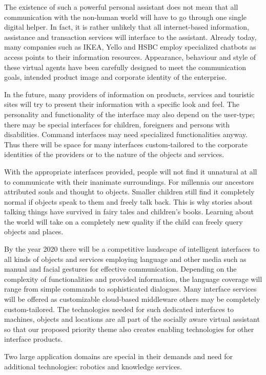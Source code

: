 \documentclass[10pt, plain]{../../metanetpaper}
\begin{document}
\begin{multicols}{2}
The existence of such a powerful personal assistant does not mean that all communication with the non-human world will have to go through one single digital helper. In fact, it is rather unlikely that all internet-based information, assistance and transaction services will interface to the assistant. Already today, many companies such as IKEA, Yello and HSBC employ specialized chatbots as access points to their information resources. Appearance, behaviour and style of these virtual agents have been carefully designed to meet the communication goals, intended product image and corporate identity of the enterprise.
 
In the future, many providers of information on products, services and touristic sites will try to present their information with a specific look and feel. The personality and functionality of the interface may also depend on the user-type; there may be special interfaces for children, foreigners and persons with disabilities. Command interfaces may need specialized functionalities anyway. Thus there will be space for many interfaces custom-tailored to the corporate identities of the providers or to the nature of the objects and services.
 
With the appropriate interfaces provided, people will not find it unnatural at all to communicate with their inanimate surroundings. For millennia our ancestors attributed souls and thought to objects. Smaller children still find it completely normal if objects speak to them and freely talk back. This is why stories about talking things have survived in fairy tales and children’s books. Learning about the world will take on a completely new quality if the child can freely query objects and places.
 
By the year 2020 there will be a competitive landscape of intelligent interfaces to all kinds of objects and services employing language and other media such as manual and facial gestures for effective communication. Depending on the complexity of functionalities and provided information, the language coverage will range from simple commands to sophisticated dialogues. Many interface services will be offered as customizable cloud-based middleware others may be completely custom-tailored. The technologies needed for such dedicated interfaces to machines, objects and locations are all part of the socially aware virtual assistant so that our proposed priority theme also creates enabling technologies for other interface products.
 
Two large application domains are special in their demands and need for additional technologies: robotics and knowledge services.
 

\end{multicols}
\end{document}
